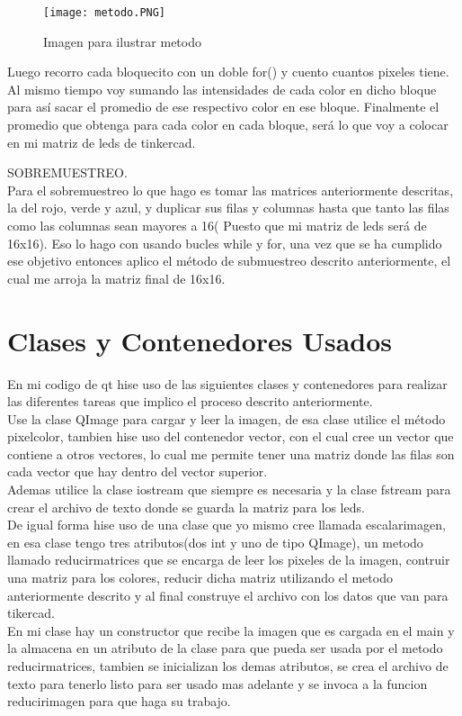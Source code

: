 \documentclass{article}
\begin{document}
\begin{figure}[h]\centering
\texttt{[image: metodo.PNG]}
\caption{Imagen para ilustrar metodo}
\label{imagen-qfb}
\end{figure}

Luego recorro cada bloquecito con un doble for() y cuento cuantos pixeles tiene. Al mismo tiempo voy sumando las intensidades de cada color en dicho bloque para así sacar el promedio de ese respectivo color en ese bloque. Finalmente el promedio que obtenga para cada color en cada bloque, será  lo que voy a colocar en mi matriz de leds de tinkercad.
\newpage

SOBREMUESTREO.\\
Para el sobremuestreo lo que hago es tomar las matrices anteriormente descritas, la del rojo, verde y azul, y duplicar sus filas y columnas hasta que tanto las filas como las columnas sean mayores a 16( Puesto que mi matriz de leds será de 16x16). Eso lo hago con usando bucles while y for, una vez que se ha cumplido ese objetivo entonces aplico el método de submuestreo descrito anteriormente, el cual me arroja la matriz final de 16x16.\\

\section{Clases y Contenedores Usados}
En mi codigo de qt hise uso de las siguientes clases y contenedores para realizar las diferentes tareas que implico el proceso descrito anteriormente.\\
Use la clase QImage para cargar y leer la imagen, de esa clase utilice el método pixelcolor, tambien hise uso del contenedor vector, con el cual cree un vector que contiene a otros vectores, lo cual me permite tener una matriz donde las filas son cada vector que hay dentro del vector superior.\\
Ademas utilice la clase iostream que siempre es necesaria y la clase fstream para crear el archivo de texto donde se guarda la matriz para los leds.\\
De igual forma hise uso de una clase que yo mismo cree llamada escalarimagen, en esa clase tengo tres atributos(dos int y uno de tipo QImage), un metodo llamado reducirmatrices que se encarga de leer los pixeles de la imagen, contruir una matriz para los colores, reducir dicha matriz utilizando el metodo anteriormente descrito y al final construye el archivo con los datos que van para tikercad.\\
En mi clase hay un constructor que recibe la imagen que es cargada en el main y la almacena en un atributo de la clase para que pueda ser usada por el metodo reducirmatrices, tambien se inicializan los demas atributos, se crea el archivo de texto para tenerlo listo para ser usado mas adelante y se invoca a la funcion reducirimagen para que haga su trabajo.
\end{document}
